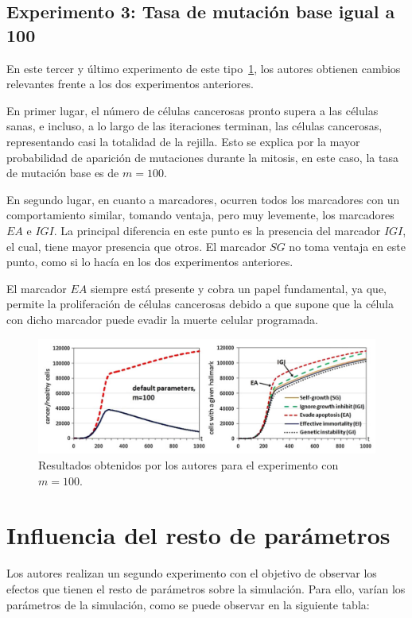 \subsection{Experimento 3: Tasa de mutación base igual a 100}

En este tercer y último experimento de este tipo~\ref{fig:exp3}, los autores obtienen cambios relevantes frente a los dos
experimentos anteriores.

En primer lugar, el número de células cancerosas pronto supera a las células sanas, e incluso,
a lo largo de las iteraciones terminan, las células cancerosas, representando casi la totalidad de
la rejilla. Esto se explica por la mayor probabilidad de aparición de mutaciones durante la mitosis, en
este caso, la tasa de mutación base es de $m=100$.

En segundo lugar, en cuanto a marcadores, ocurren todos los marcadores con un comportamiento similar,
tomando ventaja, pero muy levemente, los marcadores $EA$ e $IGI$. La principal diferencia en este punto es
la presencia del marcador $IGI$, el cual, tiene mayor presencia que otros. El marcador $SG$ no toma ventaja en
este punto, como si lo hacía en los dos experimentos anteriores.

El marcador $EA$ siempre está presente y cobra un papel fundamental, ya que, permite la proliferación
de células cancerosas debido a que supone que la célula con dicho marcador puede evadir la muerte
celular programada.

\begin{figure}[h]
\centering
\includegraphics[scale=0.6]{figures/experiments/exp3}
\caption{Resultados obtenidos por los autores para el experimento con $m=100$.}
\label{fig:exp3}
\end{figure}

\section{Influencia del resto de parámetros}

Los autores realizan un segundo experimento con el objetivo de observar los efectos
que tienen el resto de parámetros sobre la simulación. Para ello, varían los parámetros de
la simulación, como se puede observar en la siguiente tabla:

